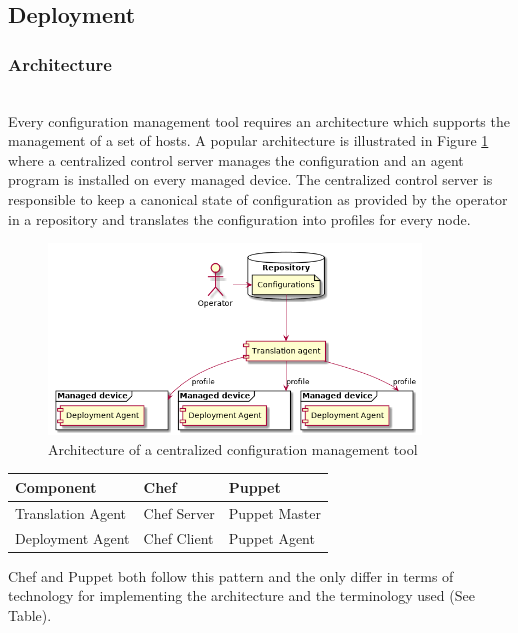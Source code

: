 \subsection{Deployment}

\subsubsection{Architecture}\hfill\\
Every configuration management tool requires an architecture which supports the management of a set of hosts. A popular architecture is illustrated in Figure \ref{fig:architecture} where a centralized control server manages the configuration and an agent program is installed on every managed device. The centralized control server is responsible to keep a canonical state of configuration as provided by the operator in a repository and translates the configuration into profiles for every node.

\begin{figure}
\includegraphics[height=2in]{assets/architecture}
\caption{Architecture of a centralized configuration management tool \cite{delaet2010survey}}
\label{fig:architecture}
\end{figure}

\begin{table}[H]
\begin{tabular}{lll}
\toprule
Component & Chef & Puppet \\
\midrule
Translation Agent  & Chef Server  & Puppet Master \\
Deployment Agent & Chef Client & Puppet Agent \\
\end{tabular}
\label{tbl:components}
\end{table}

Chef and Puppet both follow this pattern and the only differ in terms of technology for implementing the architecture and the terminology used (See Table).

